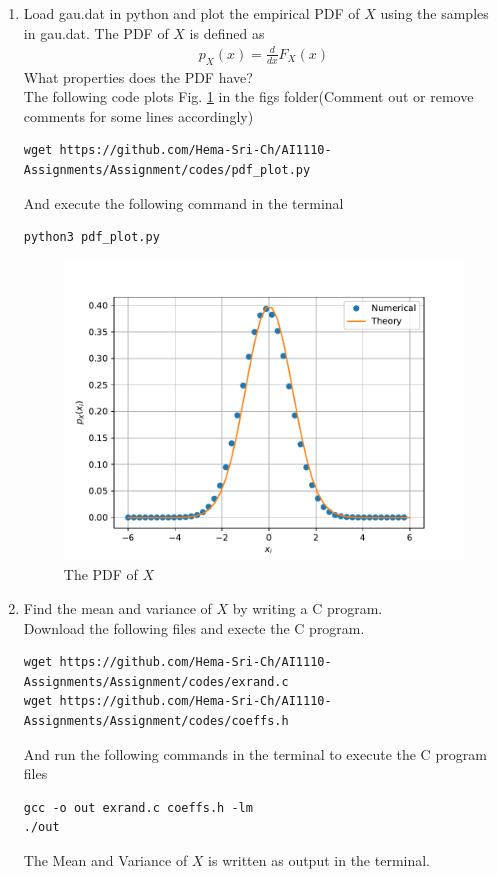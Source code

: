 \documentclass[journal,12pt,twocolumn]{article}
\renewcommand\thesection{\arabic{section}}
\begin{document}
\begin{enumerate}[label=\thesection.\arabic*
,ref=\thesection.\theenumi]
To find cdf of this gaussian function, we have its pdf as,
\begin{align}
	f(x) &= \frac{1}{\sqrt{2\pi}} e^{\frac{-x^2}{2}} , -\infty < x < \infty \\
	\implies F(x) &= 1 - \pr{\vec{x} > x} \\
	&=  1 - Q(x)
\end{align}
\item
Load gau.dat in python and plot the empirical PDF of $X$ using the samples in gau.dat. The PDF of $X$ is defined as
\begin{align}
p_{X}(x) = \frac{d}{dx}F_{X}(x)
\end{align}
What properties does the PDF have?
\\
\solution The following code plots Fig. \ref{fig:gauss_pdf} in the figs folder(Comment out or remove comments for some lines accordingly)
\begin{lstlisting}
wget https://github.com/Hema-Sri-Ch/AI1110-Assignments/Assignment/codes/pdf_plot.py
\end{lstlisting}
And execute the following command in the terminal 
\begin{lstlisting}
python3 pdf_plot.py
\end{lstlisting}
\begin{figure}[h]
	\centering
	\includegraphics[width=\columnwidth]{gauss_pdf}
	\caption{The PDF of $X$}
	\label{fig:gauss_pdf}
\end{figure}

\item Find the mean and variance of $X$ by writing a C program.
\\
\solution
Download the following files and execte the C program.
\begin{lstlisting}
wget https://github.com/Hema-Sri-Ch/AI1110-Assignments/Assignment/codes/exrand.c
wget https://github.com/Hema-Sri-Ch/AI1110-Assignments/Assignment/codes/coeffs.h
\end{lstlisting}
And run the following commands in the terminal to execute the C program files
\begin{lstlisting}
gcc -o out exrand.c coeffs.h -lm
./out
\end{lstlisting}
The Mean and Variance of $X$ is written as output in the terminal.


\end{enumerate}
\end{document}
